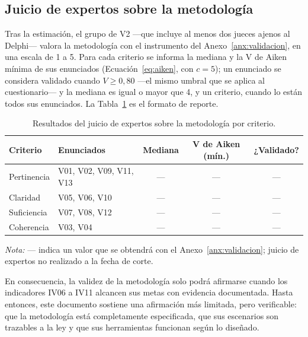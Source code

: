 \subsection{Juicio de expertos sobre la metodología}

Tras la estimación, el grupo de V2 ---que incluye al menos dos jueces ajenos al Delphi--- valora la metodología con el instrumento del Anexo~\ref{anx:validacion}, en una escala de 1 a 5. Para cada criterio se informa la mediana y la V de Aiken mínima de sus enunciados (Ecuación~\ref{eq:aiken}, con $c = 5$); un enunciado se considera validado cuando $V \ge 0{,}80$ ---el mismo umbral que se aplica al cuestionario--- y la mediana es igual o mayor que 4, y un criterio, cuando lo están todos sus enunciados. La Tabla~\ref{tab:juicio_expertos} es el formato de reporte.

\begin{table}[htbp]
  \centering
  \caption{Resultados del juicio de expertos sobre la metodología por criterio.}
  \label{tab:juicio_expertos}
  \footnotesize
  \renewcommand{\arraystretch}{1.2}
  \begin{tabular}{|l|l|c|c|c|}
    \hline
    \textbf{Criterio} & \textbf{Enunciados} & \textbf{Mediana} & \textbf{V de Aiken (mín.)} & \textbf{¿Validado?} \\
    \hline
    Pertinencia & V01, V02, V09, V11, V13 & --- & --- & --- \\ \hline
    Claridad & V05, V06, V10 & --- & --- & --- \\ \hline
    Suficiencia & V07, V08, V12 & --- & --- & --- \\ \hline
    Coherencia & V03, V04 & --- & --- & --- \\ \hline
  \end{tabular}
  \par\vspace{2pt}
  \raggedright
  \textit{Nota:} --- indica un valor que se obtendrá con el Anexo~\ref{anx:validacion}; juicio de expertos no realizado a la fecha de corte.
  \par\vspace{2pt}
\end{table}

En consecuencia, la validez de la metodología solo podrá afirmarse cuando los indicadores IV06 a IV11 alcancen sus metas con evidencia documentada. Hasta entonces, este documento sostiene una afirmación más limitada, pero verificable: que la metodología está completamente especificada, que sus escenarios son trazables a la ley y que sus herramientas funcionan según lo diseñado.

